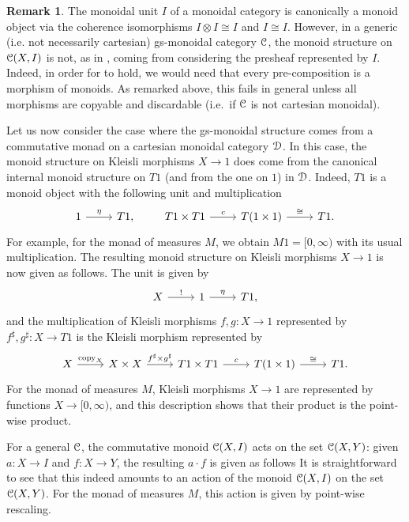 \documentclass[a4paper,UKenglish,numberwithinsect,cleveref, autoref, thm-restate]{lipics-v2021}
\theoremstyle{plain} %
\theoremstyle{definition} %
\newtheorem{myremark}[mytheorem]{Remark}
\begin{document}
\begin{myremark}
 The monoidal unit $I$ of a monoidal category is canonically a monoid object via the coherence isomorphisms $I\otimes I\cong I$ and $I\cong I$. 
 However, in a generic (i.e. not necessarily cartesian) gs-monoidal category $\mathcal{C}$, the monoid structure on $\mathcal{C}(X,I)$ is not, as in , coming from considering the presheaf represented by $I$. Indeed, in order for  to hold, we would need that every pre-composition is a morphism of monoids. As remarked above, this fails in general unless all morphisms are copyable and discardable (i.e.~if $\mathcal{C}$ is not cartesian monoidal).
\end{myremark}


Let us now consider the case where the gs-monoidal structure comes from a commutative monad on a cartesian monoidal category $\mathcal{D}$. 
In this case, the monoid structure on Kleisli morphisms $X\to 1$ does come from the canonical internal monoid structure on $T1$ (and from the one on $1$) in $\mathcal{D}$.
Indeed, $T1$ is a monoid object with the following unit and multiplication~\cite[Section~10]{kock2012distributions}
 \[
 \begin{tikzcd}
  1 \ar{r}{\eta} & T1 ,
 \end{tikzcd}
 \qquad
 \begin{tikzcd}
  T1 \times T1 \ar{r}{c} & T(1\times 1) \ar{r}{\cong} & T1 .
 \end{tikzcd}
 \]
 For example, for the monad of measures $M$, we obtain $M1=[0,\infty)$ with its usual multiplication.
 The resulting monoid structure on Kleisli morphisms $X\to 1$ is now given as follows. The unit is given by
 \[
 \begin{tikzcd}
  X \ar{r}{!} & 1 \ar{r}{\eta} & T1 ,
 \end{tikzcd}
 \]
 and the multiplication of Kleisli morphisms $f, g : X \to 1$ represented by $f^\sharp,g^\sharp:X\to T1$ is the Kleisli morphism represented by
 \[
 \begin{tikzcd}
  X \ar{r}{\mathrm{copy}_X} & X\times X \ar{r}{f^\sharp\times g^\sharp} &
  T1 \times T1 \ar{r}{c} & T(1\times 1) \ar{r}{\cong} & T1 .
 \end{tikzcd}
 \]
 For the monad of measures $M$, Kleisli morphisms $X\to 1$ are represented by functions $X\to [0,\infty)$, and this description shows that their product is the point-wise product.

For a general $\mathcal{C}$, the commutative monoid $\mathcal{C}(X,I)$ acts on the set $\mathcal{C}(X,Y)$: given $a:X\to I$ and $f:X\to Y$, the resulting $a\cdot f$ is given as follows
It is straightforward to see that this indeed amounts to an action of the monoid $\mathcal{C}(X,I)$ on the set $\mathcal{C}(X,Y)$.
For the monad of measures $M$, this action is given by point-wise rescaling.
\end{document}
